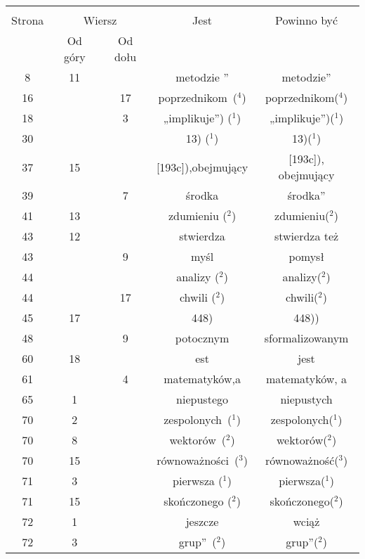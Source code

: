 \documentclass[a4paper,11pt]{article}
\begin{document}
\begin{center}

  \begin{tabular}{|c|c|c|c|c|}
    \hline
    & \multicolumn{2}{c|}{} & & \\
    Strona & \multicolumn{2}{c|}{Wiersz} & Jest
                              & Powinno być \\ \cline{2-3}
    & Od góry & Od dołu & & \\
    \hline
    8   & 11 & & metodzie ” & metodzie” \\
    16  & & 17 & poprzednikom~($^{ 4 }$) & poprzednikom($^{ 4 }$) \\
    18  & &  3 & „implikuje”) ($^{ 1 }$) & „implikuje”)($^{ 1 }$) \\
    30  & & & 13) ($^{ 1 }$) & 13)($^{ 1 }$) \\
    37  & 15 & & [193c]),obejmujący & [193c]), obejmujący \\
    39  & &  7 & środka & środka” \\
    41  & 13 & & zdumieniu ($^{ 2 }$) & zdumieniu($^{ 2 }$) \\
    43  & 12 & & stwierdza & stwierdza też \\
    43  & &  9 & myśl & pomysł \\
    44  & & & analizy ($^{ 2 }$) & analizy($^{ 2 }$) \\
    44  & & 17 & chwili ($^{ 2 }$) & chwili($^{ 2 }$) \\
    45  & 17 & & 448) & 448)) \\
    48  & &  9 & potocznym & sformalizowanym \\
    60  & 18 & & est & jest \\
    61  & &  4 & matematyków,a & matematyków, a \\
    65  &  1 & & niepustego & niepustych \\
    70  &  2 & & zespolonych~($^{ 1 }$) & zespolonych($^{ 1 }$) \\
    70  &  8 & & wektorów~($^{ 2 }$) & wektorów($^{ 2 }$) \\
    70  & 15 & & równoważności~($^{ 3 }$) & równoważność($^{ 3 }$) \\
    71  &  3 & & pierwsza ($^{ 1 }$) & pierwsza($^{ 1 }$) \\
    71  & 15 & & skończonego ($^{ 2 }$) & skończonego($^{ 2 }$) \\
    72  &  1 & & jeszcze & wciąż \\
    72  &  3 & & grup”~($^{ 2 }$) & grup”($^{ 2 }$) \\

\end{tabular}
\end{center}
\end{document}
